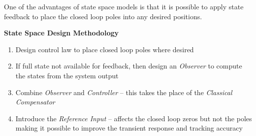 \def\FileDate{10/02/02}
\def\FileVersion{1.0}

\begin{slide}
One of the advantages of state space models is that it is possible to apply state feedback to place the closed loop poles into any desired positions.

\textbf{State Space Design Methodology}

\begin{enumerate}
	\item Design control law to place closed loop poles where desired
	\item If full state not available for feedback, then design an \emph{Observer} to compute the states from the system output
	\item Combine \emph{Observer} and \emph{Controller} -- this takes the place of the \emph{Classical Compensator}
	\item Introduce the \emph{Reference Input} -- affects the closed loop zeros but not the poles making it possible to improve the transient response and tracking accuracy
\end{enumerate}	
\end{slide}


\begin{slide}
   \begin{center}
   \end{center}
\end{slide}

